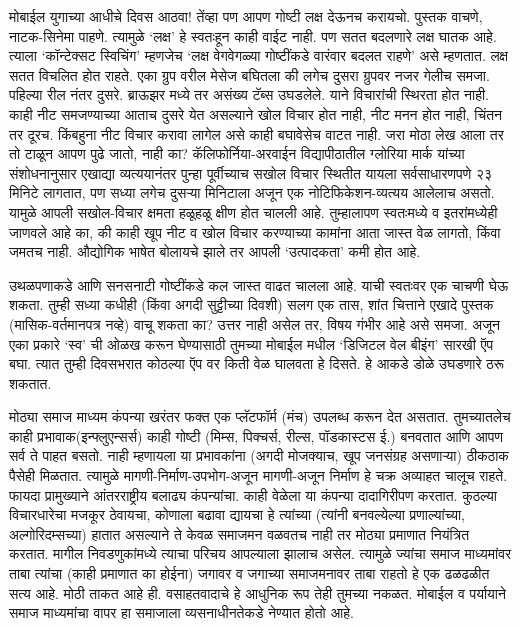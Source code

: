 मोबाईल युगाच्या आधीचे दिवस आठवा! तेंव्हा पण आपण गोष्टी लक्ष देऊनच करायचो. पुस्तक वाचणे, नाटक-सिनेमा पाहणे. त्यामुळे `लक्ष' हे स्वतःहून काही वाईट नाही. पण सतत बदलणारे लक्ष घातक आहे. त्याला `कॉन्टेक्सट स्विचिंग' म्हणजेच `लक्ष वेगवेगळ्या गोष्टींकडे वारंवार बदलत राहणे' असे म्हणतात. लक्ष सतत विचलित होत राहते. एका ग्रुप वरील मेसेज बघितला की लगेच दुसरा ग्रुपवर नजर गेलीच समजा. पहिल्या रील नंतर दुसरे. ब्राऊझर मध्ये तर असंख्य टॅब्स उघडलेले. याने विचारांची स्थिरता होत नाही. काही नीट समजण्याच्या आताच दुसरे येत असल्याने खोल विचार होत नाही, नीट मनन होत नाही, चिंतन तर दूरच. किंबहुना नीट विचार करावा लागेल असे काही बघावेसेच वाटत नाही. जरा मोठा लेख आला तर तो टाळून आपण पुढे जातो, नाही का? कॅलिफोर्निया-अरवाईन विद्यापीठातील ग्लोरिया मार्क यांच्या संशोधनानुसार एखाद्या व्यत्ययानंतर पुन्हा पूर्वीच्याच सखोल विचार स्थितीत यायला सर्वसाधारणपणे २३ मिनिटे लागतात, पण सध्या लगेच दुसऱ्या मिनिटाला अजून एक नोटिफिकेशन-व्यत्यय आलेलाच असतो. यामुळे आपली सखोल-विचार क्षमता हळूहळू क्षीण होत चालली आहे. तुम्हालापण स्वतःमध्ये व इतरांमध्येही जाणवले आहे का, की काही खूप नीट व खोल विचार करण्याच्या कामांना आता जास्त वेळ लागतो, किंवा जमतच नाही. औद्योगिक भाषेत बोलायचे झाले तर आपली `उत्पादकता' कमी होत आहे.

उथळपणाकडे आणि सनसनाटी गोष्टींकडे कल जास्त वाढत चालला आहे. याची स्वतःवर एक चाचणी घेऊ शकता. तुम्ही सध्या कधीही (किंवा अगदी सुट्टीच्या दिवशी) सलग एक तास, शांत चित्ताने एखादे पुस्तक (मासिक-वर्तमानपत्र नव्हे) वाचू शकता का? उत्तर नाही असेल तर, विषय गंभीर आहे असे समजा. अजून एका प्रकारे `स्व' ची ओळख करून घेण्यासाठी तुमच्या मोबाईल मधील `डिजिटल वेल बीइंग' सारखी ऍप बघा. त्यात तुम्ही दिवसभरात कोठल्या ऍप वर किती वेळ घालवता हे दिसते. हे आकडे डोळे उघडणारे ठरू शकतात.

मोठ्या समाज माध्यम कंपन्या खरंतर फक्त एक प्लॅटफॉर्म (मंच) उपलब्ध करून देत असतात. तुमच्यातलेच काही  प्रभावाक(इन्फ्लुएन्सर्स) काही गोष्टी (मिम्स, पिक्चर्स, रील्स, पॉडकास्टस ई.) बनवतात आणि आपण सर्व ते पाहत बसतो. नाही म्हणायला या प्रभावकांना (अगदी मोजक्याच, खूप जनसंग्रह असणाऱ्या) ठीकठाक पैसेही मिळतात. त्यामुळे मागणी-निर्माण-उपभोग-अजून मागणी-अजून निर्माण हे चक्र अव्याहत चालूच राहते. फायदा प्रामुख्याने आंतरराष्ट्रीय बलाढ्य कंपन्यांचा. काही वेळेला या कंपन्या दादागिरीपण करतात. कुठल्या विचारधारेचा मजकूर ठेवायचा, कोणाला बढावा द्यायचा हे त्यांच्या (त्यांनी बनवल्येल्या प्रणाल्यांच्या, अल्गोरिदम्सच्या) हातात असल्याने ते केवळ  समाजमन वळवतच नाही तर मोठ्या प्रमाणात नियंत्रित करतात. मागील निवडणुकांमध्ये त्याचा परिचय आपल्याला झालाच असेल. त्यामुळे ज्यांचा समाज माध्यमांवर ताबा त्यांचा (काही प्रमाणात का होईना) जगावर व जगाच्या समाजमनावर ताबा राहतो हे एक ढळढळीत सत्य आहे. मोठी ताकत आहे ही. वसाहतवादाचे हे आधुनिक रूप तेही तुमच्या नकळत. मोबाईल व पर्यायाने समाज माध्यमांचा वापर हा समाजाला व्यसनाधीनतेकडे नेण्यात होतो आहे.

